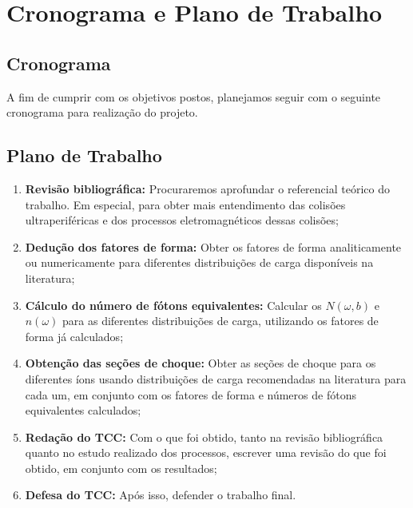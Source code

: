 \chapter{Cronograma e Plano de Trabalho}
\section{Cronograma}
A fim de cumprir com os objetivos postos, planejamos seguir com o seguinte
cronograma para realização do projeto.

\begin{table}[h]

\end{table}

\section{Plano de Trabalho}

\begin{enumerate}
	\item \textbf{Revisão bibliográfica:} Procuraremos aprofundar o referencial
	teórico do trabalho. Em especial, para obter mais entendimento das
	colisões ultraperiféricas e dos processos eletromagnéticos dessas
	colisões;
	\item \textbf{Dedução dos fatores de forma:} Obter os fatores de forma
	analiticamente ou numericamente para diferentes distribuições de carga
	disponíveis na literatura;
	\item \textbf{Cálculo do número de fótons equivalentes:} Calcular os
	$N(\omega , b)$ e $n(\omega)$ para as diferentes distribuições de
	carga, utilizando os fatores de forma já calculados;
	\item \textbf{Obtenção das seções de choque:} Obter as seções de choque
	para os diferentes íons usando distribuições de carga recomendadas na
	literatura para cada um, em conjunto com os fatores de forma e números
	de fótons equivalentes calculados;
	\item \textbf{Redação do TCC:} Com o que foi obtido, tanto na revisão
	bibliográfica quanto no estudo realizado dos processos, escrever uma
	revisão do que foi obtido, em conjunto com os resultados;
	\item \textbf{Defesa do TCC:} Após isso, defender o trabalho final.
\end{enumerate}

